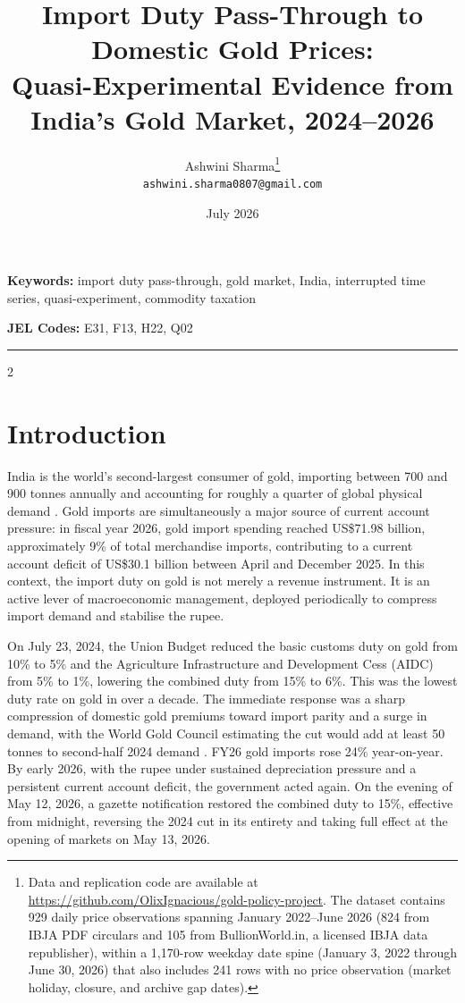 \documentclass[12pt]{article}
\title{\textbf{Import Duty Pass-Through to Domestic Gold Prices:\\
Quasi-Experimental Evidence from India's Gold Market, 2024--2026}}
\author{Ashwini Sharma\thanks{Data and replication code are available at \url{https://github.com/OlixIgnacious/gold-policy-project}. The dataset contains 929 daily price observations spanning January 2022--June 2026 (824 from IBJA PDF circulars and 105 from BullionWorld.in, a licensed IBJA data republisher), within a 1,170-row weekday date spine (January 3, 2022 through June 30, 2026) that also includes 241 rows with no price observation (market holiday, closure, and archive gap dates).}\\
\small \texttt{ashwini.sharma0807@gmail.com}}
\date{July 2026}
\begin{document}
\maketitle
\thispagestyle{empty}

\begin{abstract}

\end{abstract}

\noindent\textbf{Keywords:} import duty pass-through, gold market, India,
interrupted time series, quasi-experiment, commodity taxation

\smallskip
\noindent\textbf{JEL Codes:} E31, F13, H22, Q02

\bigskip
\noindent\rule{\linewidth}{0.4pt}
\bigskip

\begin{multicols}{2}

\section{Introduction}
\label{sec:intro}

India is the world's second-largest consumer of gold, importing between 700 and 900 tonnes annually and accounting for roughly a quarter of global physical demand \citep{WGCgdt2025}. Gold imports are simultaneously a major source of current account pressure: in fiscal year 2026, gold import spending reached US\$71.98 billion, approximately 9\% of total merchandise imports, contributing to a current account deficit of US\$30.1 billion between April and December 2025. In this context, the import duty on gold is not merely a revenue instrument. It is an active lever of macroeconomic management, deployed periodically to compress import demand and stabilise the rupee.

On July 23, 2024, the Union Budget reduced the basic customs duty on gold from 10\% to 5\% and the Agriculture Infrastructure and Development Cess (AIDC) from 5\% to 1\%, lowering the combined duty from 15\% to 6\%. This was the lowest duty rate on gold in over a decade. The immediate response was a sharp compression of domestic gold premiums toward import parity and a surge in demand, with the World Gold Council estimating the cut would add at least 50 tonnes to second-half 2024 demand \citep{WGC2024Jul}. FY26 gold imports rose 24\% year-on-year. By early 2026, with the rupee under sustained depreciation pressure and a persistent current account deficit, the government acted again. On the evening of May 12, 2026, a gazette notification restored the combined duty to 15\%, effective from midnight, reversing the 2024 cut in its entirety and taking full effect at the opening of markets on May 13, 2026.


\end{multicols}
\end{document}
